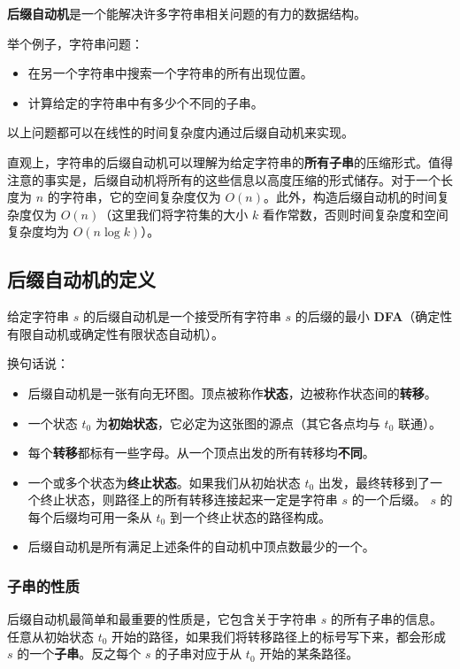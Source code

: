 
\textbf{后缀自动机}是一个能解决许多字符串相关问题的有力的数据结构。

举个例子，字符串问题：

\begin{itemize}
\item 在另一个字符串中搜索一个字符串的所有出现位置。
\item 计算给定的字符串中有多少个不同的子串。
\end{itemize}

以上问题都可以在线性的时间复杂度内通过后缀自动机来实现。

直观上，字符串的后缀自动机可以理解为给定字符串的\textbf{所有子串}的压缩形式。值得注意的事实是，后缀自动机将所有的这些信息以高度压缩的形式储存。对于一个长度为 $n$ 的字符串，它的空间复杂度仅为 $O(n)$。此外，构造后缀自动机的时间复杂度仅为 $O(n)$（这里我们将字符集的大小 $k$ 看作常数，否则时间复杂度和空间复杂度均为 $O(n\log k)$）。

\subsection{后缀自动机的定义}

给定字符串 $s$ 的后缀自动机是一个接受所有字符串 $s$ 的后缀的最小 \textbf{DFA}（确定性有限自动机或确定性有限状态自动机）。

换句话说：

\begin{itemize}
\item 后缀自动机是一张有向无环图。顶点被称作\textbf{状态}，边被称作状态间的\textbf{转移}。
\item 一个状态 $t_0$ 为\textbf{初始状态}，它必定为这张图的源点（其它各点均与 $t_0$ 联通）。
\item 每个\textbf{转移}都标有一些字母。从一个顶点出发的所有转移均\textbf{不同}。
\item 一个或多个状态为\textbf{终止状态}。如果我们从初始状态 $t_0$ 出发，最终转移到了一个终止状态，则路径上的所有转移连接起来一定是字符串 $s$ 的一个后缀。 $s$ 的每个后缀均可用一条从 $t_0$ 到一个终止状态的路径构成。
\item 后缀自动机是所有满足上述条件的自动机中顶点数最少的一个。
\end{itemize}

\subsubsection{子串的性质}

后缀自动机最简单和最重要的性质是，它包含关于字符串 $s$ 的所有子串的信息。任意从初始状态 $t_0$ 开始的路径，如果我们将转移路径上的标号写下来，都会形成 $s$ 的一个\textbf{子串}。反之每个 $s$ 的子串对应于从 $t_0$ 开始的某条路径。

